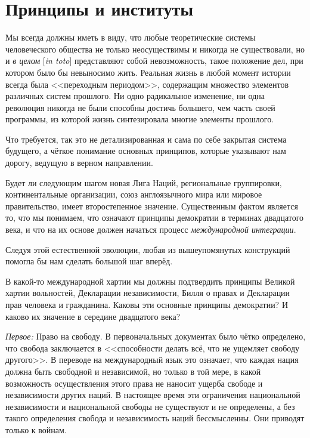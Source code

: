 \chapter{Принципы и институты}

Мы всегда должны иметь в виду, что любые теоретические системы человеческого общества не только неосуществимы и никогда не существовали, но и \textit{в целом} [\textit{in toto}] представляют собой невозможность, такое положение дел, при котором было бы невыносимо жить. Реальная жизнь в любой момент истории всегда была <<переходным периодом>>, содержащим множество элементов различных систем прошлого. Ни одно радикальное изменение, ни одна революция никогда не были способны достичь большего, чем часть своей программы, из которой жизнь синтезировала многие элементы прошлого.
 
Что требуется, так это не детализированная и сама по себе закрытая система будущего, а чёткое понимание основных принципов, которые указывают нам дорогу, ведущую в верном направлении.

Будет ли следующим шагом новая Лига Наций, региональные группировки, континентальные организации, союз англоязычного мира или мировое правительство, имеет второстепенное значение. Существенным фактом является то, что мы понимаем, что означают принципы демократии в терминах двадцатого века, и что на их основе должен начаться процесс \textit{международной интеграции}.
 
Следуя этой естественной эволюции, любая из вышеупомянутых конструкций помогла бы нам сделать большой шаг вперёд.

В какой-то международной хартии мы должны подтвердить принципы Великой хартии вольностей, Декларации независимости, Билля о правах и Декларации прав человека и гражданина. Каковы эти основные принципы демократии? И каково их значение в середине двадцатого века?
 
\textit{Первое:} Право на свободу. В первоначальных документах было чётко определено, что свобода заключается в <<способности делать всё, что не ущемляет свободу другого>>. В переводе на международный язык это означает, что каждая нация должна быть свободной и независимой, но только в той мере, в какой возможность осуществления этого права не наносит ущерба свободе и независимости других наций. В настоящее время эти ограничения национальной независимости и национальной свободы не существуют и не определены, а без такого определения свобода и независимость наций бессмысленны. Они приводят только к войнам.

